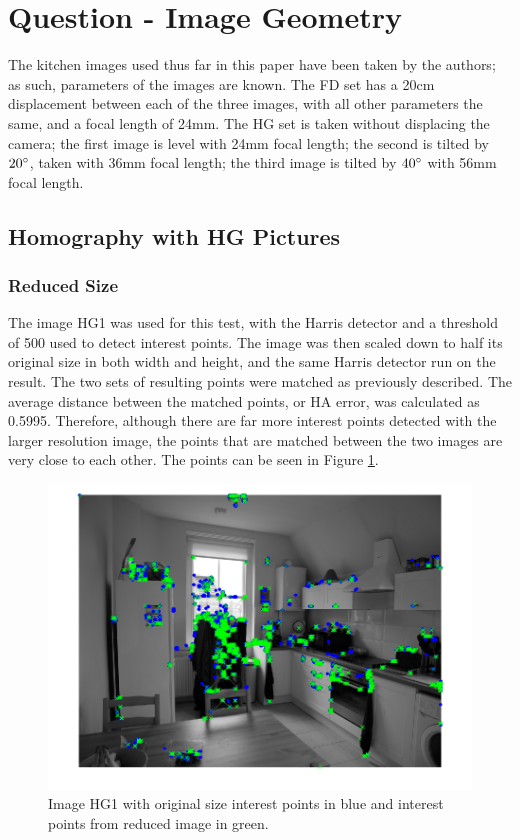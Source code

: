 \documentclass[a4paper, 10pt, conference]{ieeeconf}
\begin{document}
\section{Question - Image Geometry}
The kitchen images used thus far in this paper have been taken by the authors; as such, parameters of the images are known. The FD set has a 20cm displacement between each of the three images, with all other parameters the same, and a focal length of 24mm. The HG set is taken without displacing the camera; the first image is level with 24mm focal length; the second is tilted by $20\degree$, taken with 36mm focal length; the third image is tilted by $40\degree$ with 56mm focal length.

\subsection{Homography with HG Pictures}
\subsubsection{Reduced Size}
The image HG1 was used for this test, with the Harris detector and a threshold of 500 used to detect interest points. The image was then scaled down to half its original size in both width and height, and the same Harris detector run on the result. The two sets of resulting points were matched as previously described. The average distance between the matched points, or HA error, was calculated as 0.5995. Therefore, although there are far more interest points detected with the larger resolution image, the points that are matched between the two images are very close to each other. The points can be seen in Figure \ref{fig:reducedcompare}.

\begin{figure}[!ht]
  \centering
  \includegraphics[width=\linewidth]{pic/q2_1_a_imgBoth}
  \caption{Image HG1 with original size interest points in blue and interest points from reduced image in green.}
  \label{fig:reducedcompare}
\end{figure}
\end{document}

